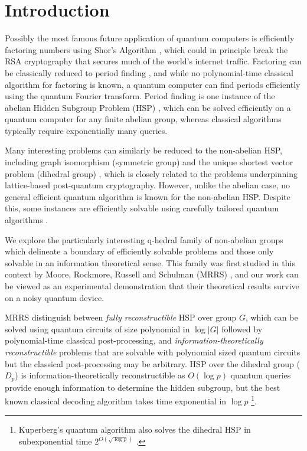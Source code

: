 \section{Introduction}
Possibly the most famous future application of quantum computers is efficiently factoring numbers using Shor's Algorithm \cite{shor1999polynomial}, which could in principle break the RSA cryptography \cite{rivest1978method} that secures much of the world’s internet traffic. Factoring can be classically reduced to period finding \cite{shor1999polynomial}, and while no polynomial-time classical algorithm for factoring is known, a quantum computer can find periods efficiently using the quantum Fourier transform. Period finding is one instance of the abelian Hidden Subgroup Problem (HSP) \cite{kitaev1995quantum}, which can be solved efficiently on a quantum computer for any finite abelian group, whereas classical algorithms typically require exponentially many queries.

Many interesting problems can similarly be reduced to the non-abelian HSP, including graph isomorphism (symmetric group) \cite{beals1997quantum, hallgren2010limitations} and the unique shortest vector problem (dihedral group) \cite{regev2004quantum}, which is closely related to the problems underpinning lattice-based post-quantum cryptography. However, unlike the abelian case, no general efficient quantum algorithm is known for the non-abelian HSP. Despite this, some instances are efficiently solvable using carefully tailored quantum algorithms \cite{hallgren2000normal, bacon2005optimal, moore2007power, grigni2001quantum, ivanyos2001efficient, friedl2014hidden, morales2026hidden, Inui_2007}.

 We explore the particularly interesting q-hedral family of non-abelian groups which delineate a boundary of efficiently solvable problems and those only solvable in an information theoretical sense. This family was first studied in this context by Moore, Rockmore, Russell and Schulman (MRRS) \cite{moore2002hidden, moore2007power}, and our work can be viewed as an experimental demonstration that their theoretical results survive on a noisy quantum device.

MRRS distinguish between \emph{fully reconstructible} HSP over group $G$, which can be solved using quantum circuits of size polynomial in $\log|G|$ followed by polynomial-time classical post-processing, and \emph{information-theoretically reconstructible} problems that are solvable with polynomial sized quantum circuits but the classical post-processing may be arbitrary. HSP over the dihedral group ($D_p$) is information-theoretically reconstructible as $O(\log p)$ quantum queries provide enough information to determine the hidden subgroup, but the best known classical decoding algorithm takes time exponential in $\log p$ \cite{ettinger1999quantum}\footnote{Kuperberg’s quantum algorithm also solves the dihedral HSP in subexponential time $2^{O(\sqrt{\log p})}$ \cite{kuperberg2005subexponential}.}. 

